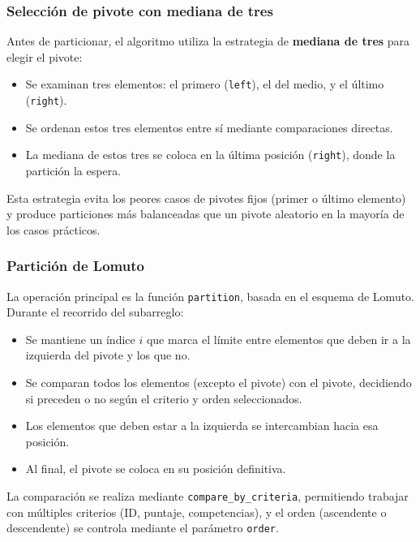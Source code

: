 \subsubsection{Selección de pivote con mediana de tres}

Antes de particionar, el algoritmo utiliza la estrategia de \textbf{mediana de tres} para elegir el pivote:

\begin{itemize}
    \item Se examinan tres elementos: el primero (\texttt{left}), el del medio, y el último (\texttt{right}).
    \item Se ordenan estos tres elementos entre sí mediante comparaciones directas.
    \item La mediana de estos tres se coloca en la última posición (\texttt{right}), donde la partición la espera.
\end{itemize}

Esta estrategia evita los peores casos de pivotes fijos (primer o último elemento) y produce particiones más balanceadas que un pivote aleatorio en la mayoría de los casos prácticos.

\subsubsection{Partición de Lomuto}

La operación principal es la función \texttt{partition}, basada en el esquema de Lomuto. Durante el recorrido del subarreglo:

\begin{itemize}
    \item Se mantiene un índice \(i\) que marca el límite entre elementos que deben ir a la izquierda del pivote y los que no.
    \item Se comparan todos los elementos (excepto el pivote) con el pivote, decidiendo si preceden o no según el criterio y orden seleccionados.
    \item Los elementos que deben estar a la izquierda se intercambian hacia esa posición.
    \item Al final, el pivote se coloca en su posición definitiva.
\end{itemize}

La comparación se realiza mediante \texttt{compare\_by\_criteria}, permitiendo trabajar con múltiples criterios (ID, puntaje, competencias), y el orden (ascendente o descendente) se controla mediante el parámetro \texttt{order}.

